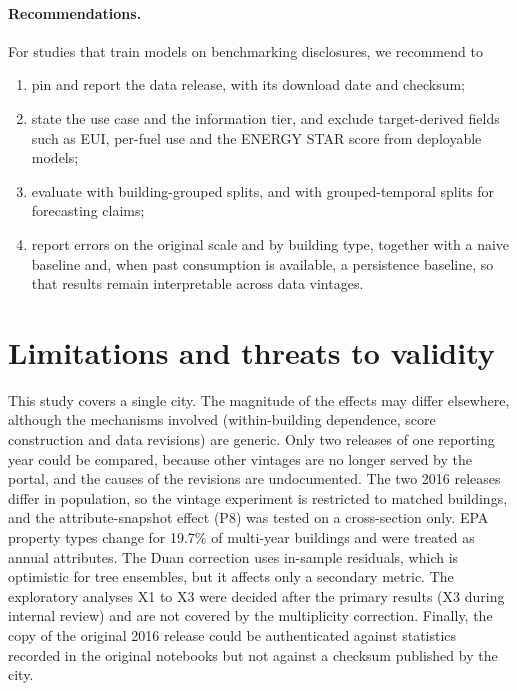 \documentclass[11pt]{article}
\begin{document}
\paragraph{Recommendations.} For studies that train models on benchmarking disclosures, we recommend to
\begin{enumerate}
  \item pin and report the data release, with its download date and checksum;
  \item state the use case and the information tier, and exclude target-derived fields such as EUI, per-fuel use and the ENERGY STAR score from deployable models;
  \item evaluate with building-grouped splits, and with grouped-temporal splits for forecasting claims;
  \item report errors on the original scale and by building type, together with a naive baseline and, when past consumption is available, a persistence baseline, so that results remain interpretable across data vintages.
\end{enumerate}

\section{Limitations and threats to validity}
\label{sec:limitations}
This study covers a single city. The magnitude of the effects may differ elsewhere, although the mechanisms involved (within-building dependence, score construction and data revisions) are generic. Only two releases of one reporting year could be compared, because other vintages are no longer served by the portal, and the causes of the revisions are undocumented. The two 2016 releases differ in population, so the vintage experiment is restricted to matched buildings, and the attribute-snapshot effect (P8) was tested on a cross-section only. EPA property types change for 19.7\% of multi-year buildings and were treated as annual attributes. The Duan correction uses in-sample residuals, which is optimistic for tree ensembles, but it affects only a secondary metric. The exploratory analyses X1 to X3 were decided after the primary results (X3 during internal review) and are not covered by the multiplicity correction. Finally, the copy of the original 2016 release could be authenticated against statistics recorded in the original notebooks but not against a checksum published by the city.
\end{document}
